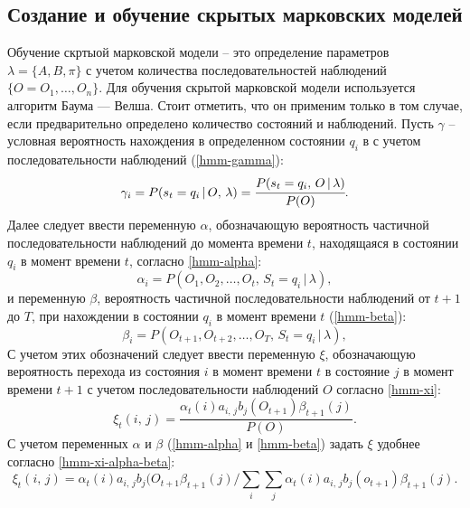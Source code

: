 \subsection{Создание и обучение скрытых марковских моделей}
Обучение скртыой марковской модели -- это определение параметров $\lambda = \{A, B, \pi\}$ с учетом количества последовательностей наблюдений $\{O = O_1, \dots, O_n\}$. Для обучения скрытой  марковской модели используется алгоритм Баума --- Велша. Стоит отметить, что он применим только в том случае, если предварительно определено количество состояний и наблюдений.
Пусть $\gamma$ -- условная вероятность нахождения в определенном состоянии $q_i$ в с учетом последовательности наблюдений (\ref{hmm-gamma}):
\begin{equation}\label{hmm-gamma}
	\gamma_i = P(s_t = q_i\,|\,O,\,\lambda) = \cfrac{P(s_t = q_i,\,O\,|\,\lambda)}{P(O)}.
\end{equation}
Далее следует ввести переменную $\alpha$, обозначающую вероятность частичной последовательности наблюдений до момента времени $t$, находящаяся в состоянии $q_i$ в момент времени $t$, согласно \ref{hmm-alpha}:
\begin{equation}\label{hmm-alpha}
	\alpha_i = P(O_1, O_2, \dots, O_t,\, S_t = q_i\,|\,\lambda),
\end{equation}
и переменную $\beta$, вероятность частичной последовательности наблюдений от $t + 1$ до $T$, при нахождении в состоянии $q_i$ в момент времени $t$ (\ref{hmm-beta}): 
\begin{equation}\label{hmm-beta}
	\beta_i = P(O_{t+1}, O_{t+2}, \dots, O_T,\, S_t = q_i\,|\,\lambda),
\end{equation}
С учетом этих обозначений следует ввести переменную $\xi$, обозначающую вероятность перехода из состояния $i$ в момент времени $t$ в состояние $j$ в момент времени $t + 1$ с учетом последовательности наблюдений $O$ согласно \ref{hmm-xi}:
\begin{equation}\label{hmm-xi}
	\xi_t(i,\,j) = \frac{\alpha_t(i)a_{i,\,j}b_j(O_{t+1})\beta_{t+1}(j)}{P(O)}.
\end{equation}
С учетом переменных $\alpha$ и $\beta$ (\ref{hmm-alpha} и \ref{hmm-beta}) задать $\xi$ удобнее согласно \ref{hmm-xi-alpha-beta}:
\begin{equation}\label{hmm-xi-alpha-beta}
	\xi_t(i,\,j) = \alpha_t(i)a_{i,\,j}b_j(O_{t+1}\beta_{t+1}(j) \bigg/ \sum_{i}\sum_{j}\alpha_t(i)a_{i,\,j}b_j(o_{t+1})\beta_{t+1}(j).
\end{equation}
